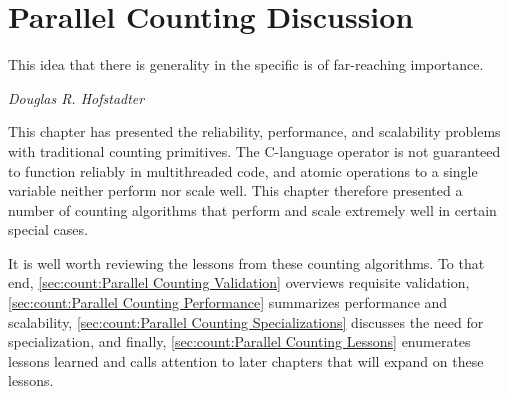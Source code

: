 \section{Parallel Counting Discussion}
\label{sec:count:Parallel Counting Discussion}
%
\epigraph{This idea that there is generality in the specific is of
	  far-reaching importance.}
	 {\emph{Douglas R. Hofstadter}}

This chapter has presented the reliability, performance, and
scalability problems with traditional counting primitives.
The C-language \co{++} operator is not guaranteed to function reliably in
multithreaded code, and atomic operations to a single variable neither
perform nor scale well.
This chapter therefore presented a number of counting algorithms that
perform and scale extremely well in certain special cases.

It is well worth reviewing the lessons from these counting algorithms.
To that end,
\cref{sec:count:Parallel Counting Validation}
overviews requisite validation,
\cref{sec:count:Parallel Counting Performance}
summarizes performance and scalability,
\cref{sec:count:Parallel Counting Specializations}
discusses the need for specialization,
and finally,
\cref{sec:count:Parallel Counting Lessons}
enumerates lessons learned and calls attention to later chapters that
will expand on these lessons.

